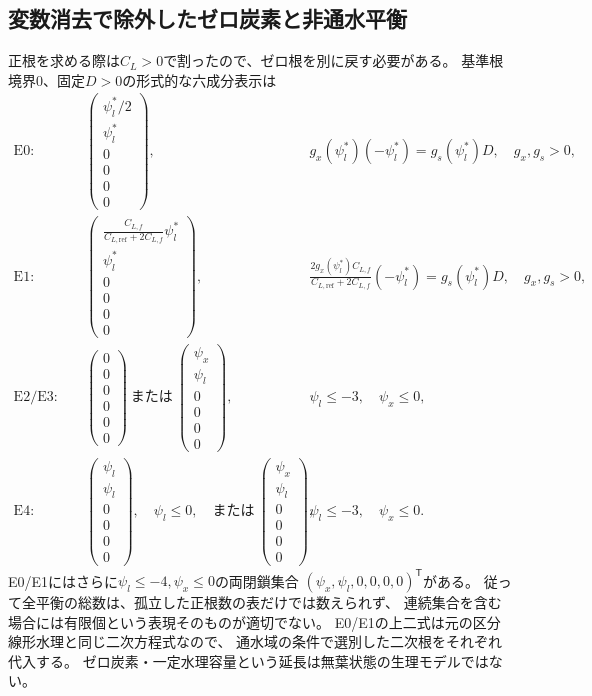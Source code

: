 \documentclass[a4paper,11pt]{ltjsarticle}
\newcommand{\tr}{^{\mathsf T}}
\begin{document}
\subsection{変数消去で除外したゼロ炭素と非通水平衡}
正根を求める際は$C_L>0$で割ったので、ゼロ根を別に戻す必要がある。
基準根境界0、固定$D>0$の形式的な六成分表示は
\begin{align}
\mathrm{E0}:\quad&
\begin{pmatrix}\psi_l^*/2\\\psi_l^*\\0\\0\\0\\0\end{pmatrix},
&&g_x(\psi_l^*)(-\psi_l^*)=g_s(\psi_l^*)D,\quad g_x,g_s>0,\\
\mathrm{E1}:\quad&
\begin{pmatrix}
\frac{C_{L,f}}{C_{L,\mathrm{ref}}+2C_{L,f}}\psi_l^*\\
\psi_l^*\\0\\0\\0\\0
\end{pmatrix},
&&\frac{2g_x(\psi_l^*)C_{L,f}}{C_{L,\mathrm{ref}}+2C_{L,f}}(-\psi_l^*)
=g_s(\psi_l^*)D,\quad g_x,g_s>0,\\
\mathrm{E2/E3}:\quad&
\begin{pmatrix}0\\0\\0\\0\\0\\0\end{pmatrix}
\ \text{または}\
\begin{pmatrix}\psi_x\\\psi_l\\0\\0\\0\\0\end{pmatrix},
&&\psi_l\le-3,\quad\psi_x\le0,\\
\mathrm{E4}:\quad&
\begin{pmatrix}\psi_l\\\psi_l\\0\\0\\0\\0\end{pmatrix},\quad\psi_l\le0,
\quad\text{または}\
\begin{pmatrix}\psi_x\\\psi_l\\0\\0\\0\\0\end{pmatrix},
&&\psi_l\le-3,\quad\psi_x\le0 .
\end{align}
E0/E1にはさらに$\psi_l\le-4,\psi_x\le0$の両閉鎖集合
$(\psi_x,\psi_l,0,0,0,0)\tr$がある。
従って全平衡の総数は、孤立した正根数の表だけでは数えられず、
連続集合を含む場合には有限個という表現そのものが適切でない。
E0/E1の上二式は元の区分線形水理と同じ二次方程式なので、
通水域の条件で選別した二次根をそれぞれ代入する。
ゼロ炭素・一定水理容量という延長は無葉状態の生理モデルではない。
\end{document}
